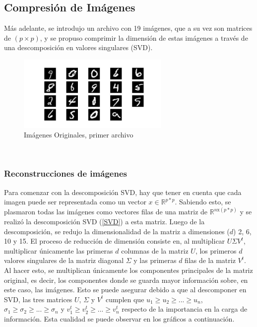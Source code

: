 \documentclass[12pt,a4]{article} %
\begin{document}
\subsection{Compresión de Imágenes}
Más adelante, se introdujo un archivo con 19 imágenes, que a su vez son matrices de $(p \times p)$, y se propuso comprimir la dimensión de estas imágenes a través de una descomposición en valores singulares (SVD).
\begin{figure}[H]
    \centering
    \includegraphics[width=0.65\textwidth]{latex_project/Graficos_ej2/original_images1.jpeg}
    \caption{Imágenes Originales, primer archivo}
    \label{fig:original_images1}
\end{figure}
\\

\subsubsection{Reconstrucciones de imágenes}
Para comenzar con la descomposición SVD, hay que tener en cuenta que cada imagen puede ser representada como un vector $x \in \mathbb{R}^{p*p}$. Sabiendo esto, se plasmaron todas las imágenes como vectores filas de una matriz de $\mathbb{R}^{n\text{x}(p*p)}$ y se realizó la descomposición SVD (\ref{SVD}) a esta matriz. Luego de la descomposición, se redujo la dimensionalidad de la matriz a dimensiones ($d$) 2, 6, 10 y 15. El proceso de reducción de dimensión consiste en, al multiplicar $U \Sigma V^{t}$, multiplicar únicamente las primeras $d$ columnas de la matriz $U$, los primeros $d$ valores singulares de la matriz diagonal $\Sigma$ y las primeras $d$ filas de la matriz $V^{t}$. Al hacer esto, se multiplican únicamente los componentes principales de la matriz original, es decir, los componentes donde se guarda mayor información sobre, en este caso, las imágenes. Esto se puede asegurar debido a que al descomponer en SVD, las tres matrices $U$, $\Sigma$ y $V^{t}$ cumplen que $u_1 \geq u_2 \geq ... \geq u_n$, $\sigma_1 \geq \sigma_2 \geq ... \geq \sigma_n$ y $v^{t}_1 \geq v^{t}_2 \geq ... \geq v^{t}_n$ respecto de la importancia en la carga de información. Esta cualidad se puede observar en los gráficos a continuación.
\end{document}
